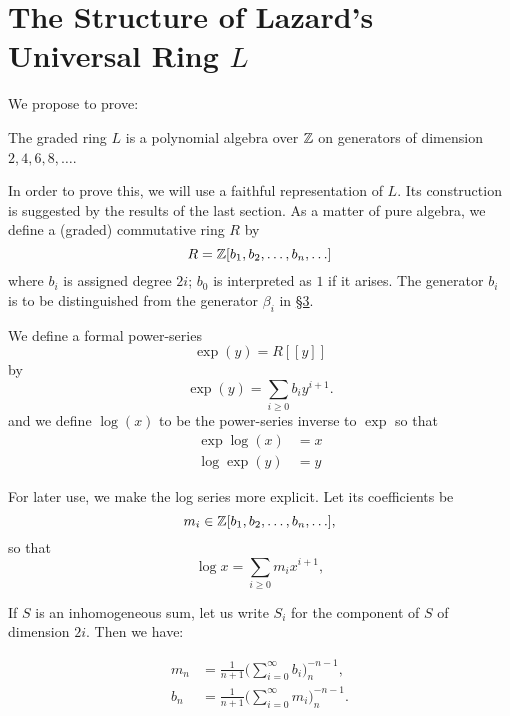 \documentclass[../main]{subfiles}
\begin{document}
\label{sec:p2c7}

\chapter{The Structure of Lazard's Universal Ring \texorpdfstring{$L$}{L}}
We propose to prove: 

\begin{theorem}
\label{thm:p2c07.1}
The graded ring $L$ is a polynomial algebra over $\mathbb{Z}$ on generators of dimension $2, 4, 6, 8, \ldots$.
\end{theorem}

In order to prove this, we will use a faithful representation of $L$. Its construction is suggested by the results of the last section. As a matter of pure algebra, we define a (graded) commutative ring $R$ by \[R = \mathbb{Z}[b_1, b_2, \ldots, b_n, \ldots]\] where $b_i$ is assigned degree $2i$; $b_0$ is interpreted as $1$ if it arises. The generator $b_i$ is to be distinguished from the generator $\beta_i$ in \hyperref[sec:p2c3]{\S 3}.

We define a formal power-series \[\exp(y) = R[[y]]\] by 
\begin{equation}
\tag{7.2} 
\label{eqn:p2c07.2}
\exp(y) = \sum_{i \ge 0} b_i y^{i + 1}.
\end{equation}
and we define $\log(x)$ to be the power-series inverse to $\exp$ so that
\begin{equation}
\tag{7.3}
\label{eqn:p2c07.3}
\begin{split}
\exp \log(x) & = x \\
\log \exp(y) & = y
\end{split}
\end{equation}

For later use, we make the log series more explicit. Let its coefficients be \[m_i \in \mathbb{Z} [b_1, b_2, \ldots, b_n, \ldots],\] so that 
\begin{equation}
\tag{7.4}
\label{eqn:p2c07.4}
\log x = \sum_{i \ge 0} m_i x^{i + 1},
\end{equation}

If $S$ is an inhomogeneous sum, let us write $S_i$ for the component of $S$ of dimension $2i$. Then we have: 

\begin{customprop}{7.5}
\label{prop:p2c07.5}
\begin{align*}m_n & = \frac 1 {n + 1} \bigg(\sum_{i = 0}^\infty b_i\bigg)_n^{-n-1}, \\ b_n & = \frac 1 {n + 1} \bigg(\sum_{i = 0}^\infty m_i\bigg)_n^{-n-1}.\end{align*}
\end{customprop}
\end{document}
